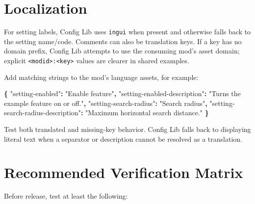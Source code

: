 \documentclass[
  11pt,
  letterpaper,
  titlepage]{article}
\newenvironment{Shaded}{\begin{snugshade}}{\end{snugshade}}
\newcommand{\DataTypeTok}[1]{\textcolor[rgb]{0.13,0.29,0.53}{#1}}
\newcommand{\FunctionTok}[1]{\textcolor[rgb]{0.13,0.29,0.53}{\textbf{#1}}}
\newcommand{\StringTok}[1]{\textcolor[rgb]{0.31,0.60,0.02}{#1}}
\begin{document}
\section{Localization}\label{localization}

For setting labels, Config Lib uses \texttt{ingui} when present and
otherwise falls back to the setting name/code. Comments can also be
translation keys. If a key has no domain prefix, Config Lib attempts to
use the consuming mod's asset domain; explicit
\texttt{\textless{}modid\textgreater{}:\textless{}key\textgreater{}}
values are clearer in shared examples.

Add matching strings to the mod's language assets, for example:

\begin{Shaded}
\begin{Highlighting}[]
\FunctionTok{\{}
  \DataTypeTok{"setting{-}enabled"}\FunctionTok{:} \StringTok{"Enable feature"}\FunctionTok{,}
  \DataTypeTok{"setting{-}enabled{-}description"}\FunctionTok{:} \StringTok{"Turns the example feature on or off."}\FunctionTok{,}
  \DataTypeTok{"setting{-}search{-}radius"}\FunctionTok{:} \StringTok{"Search radius"}\FunctionTok{,}
  \DataTypeTok{"setting{-}search{-}radius{-}description"}\FunctionTok{:} \StringTok{"Maximum horizontal search distance."}
\FunctionTok{\}}
\end{Highlighting}
\end{Shaded}

Test both translated and missing-key behavior. Config Lib falls back to
displaying literal text when a separator or description cannot be
resolved as a translation.

\section{Recommended Verification
Matrix}\label{recommended-verification-matrix}

Before release, test at least the following:
\end{document}
